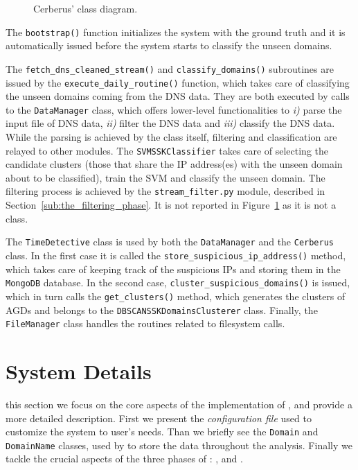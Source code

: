 \begin{figure}[!htp]
    \caption{Cerberus' class diagram.}
    \label{fig:cerberus_overview}
\end{figure}
The \texttt{bootstrap()} function initializes the
system with the ground truth and it is automatically issued before the system
starts to classify the unseen domains.

The \texttt{fetch\_dns\_cleaned\_stream()} and \texttt{classify\_domains()}
subroutines are issued by the \texttt{execute\_daily\_routine()} function, which
takes care of classifying the unseen domains coming from the DNS data. They are
both executed by calls to the \texttt{DataManager} class, which offers
lower-level functionalities to \emph{i)} parse the input file of DNS data,
\emph{ii)} filter the DNS data and \emph{iii)} classify the DNS data.
While the parsing is achieved by the class itself, filtering and classification
are relayed to other modules. The \texttt{SVMSSKClassifier} takes care of
selecting the candidate clusters (those that share the IP address(es) with the
unseen domain about to be classified), train the SVM and classify the
unseen domain. The filtering process is achieved by the \texttt{stream\_filter.py}
module, described in Section~\ref{sub:the_filtering_phase}. It is not reported in
Figure~\ref{fig:cerberus_overview} as it is not a class.

The \texttt{TimeDetective} class is used by both the \texttt{DataManager} and the
\texttt{Cerberus} class. In the first case it is called the
\texttt{store\_suspicious\_ip\_address()} method, which takes care of keeping
track of the suspicious IPs and storing them in the \texttt{MongoDB} database.
In the second case, \texttt{cluster\_suspicious\_domains()} is issued,
which in turn calls the \texttt{get\_clusters()} method, which generates the
clusters of AGDs and belongs to the \texttt{DBSCANSSKDomainsClusterer} class.
Finally, the \texttt{FileManager} class handles the routines related to
filesystem calls.


\section{System Details} %
\label{sec:system_details}
 this section we focus on the core aspects of the
implementation of \thesystem, and provide a more detailed description. First we
present the \emph{configuration file} used to customize the system to user's needs.
Than we  briefly see the \texttt{Domain} and \texttt{DomainName} classes, used
by \thesystem to store the data throughout the analysis. Finally we tackle the
crucial aspects of the three phases of \thesystem: ,
 and .

